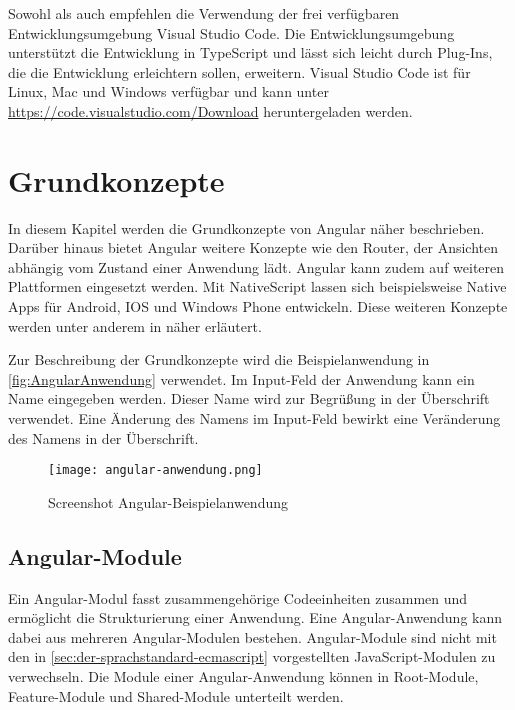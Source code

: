 Sowohl \textcite[vgl.][3\psqq]{Woiwode.2018} als auch \textcite[vgl.][3\psqq]{Steyer.2017} empfehlen die Verwendung der frei verfügbaren Entwicklungsumgebung Visual Studio Code. Die Entwicklungsumgebung unterstützt die Entwicklung in TypeScript und lässt sich leicht durch Plug-Ins, die die Entwicklung erleichtern sollen, erweitern. Visual Studio Code ist für Linux, Mac und Windows verfügbar und kann unter \url{https://code.visualstudio.com/Download}  heruntergeladen werden.


\section{Grundkonzepte}
In diesem Kapitel werden die Grundkonzepte von Angular näher beschrieben. Darüber hinaus bietet Angular weitere Konzepte wie den Router, der Ansichten abhängig vom Zustand einer Anwendung lädt. Angular kann zudem auf weiteren Plattformen eingesetzt werden. Mit NativeScript lassen sich beispielsweise Native Apps für Android, IOS und Windows Phone entwickeln.\autocites[vgl.][109]{Steyer.2017}[vgl.][431-440]{Woiwode.2018} Diese weiteren Konzepte werden unter anderem in \textcites{Woiwode.2018}{Steyer.2017} näher erläutert.
\label{NativeScript}


\label{BeschreibungHelloBsp}
Zur Beschreibung der Grundkonzepte wird die Beispielanwendung in \autoref{fig:AngularAnwendung} verwendet. Im Input-Feld der Anwendung kann ein Name eingegeben werden. Dieser Name wird zur Begrüßung in der Überschrift verwendet. Eine Änderung des Namens im Input-Feld bewirkt eine Veränderung des Namens in der Überschrift.

\begin{figure}[h]
	\centering
	\texttt{[image: angular-anwendung.png]}
	\caption{Screenshot Angular-Beispielanwendung} 
	\label{fig:AngularAnwendung}
\end{figure}


\subsection{Angular-Module}

Ein Angular-Modul fasst zusammengehörige Codeeinheiten zusammen und ermöglicht die Strukturierung einer Anwendung. Eine Angular-Anwendung kann dabei aus mehreren Angular-Modulen bestehen. Angular-Module sind nicht mit den in \autoref{sec:der-sprachstandard-ecmascript} vorgestellten JavaScript-Modulen zu verwechseln. \autocites[vgl.][103\psqq]{Steyer.2017}[vgl.][301\psqq]{Woiwode.2018} Die Module einer Angular-Anwendung können in Root-Module, Feature-Module und Shared-Module unterteilt werden.

